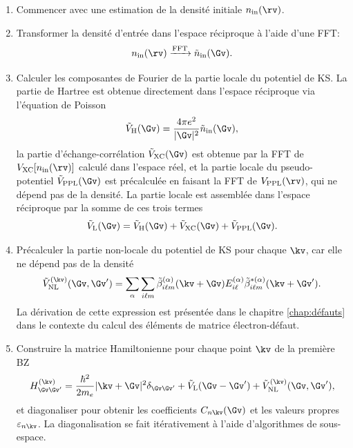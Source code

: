\begin{enumerate}
    \item Commencer avec une estimation de la densité initiale $n_\text{in}(\rv)$.
    \item Transformer la densité d'entrée dans l'espace réciproque à l'aide d'une FFT:
    \begin{equation*}
        n_\text{in}(\rv) \xrightarrow{\text{FFT}} \tilde{n}_\text{in}(\Gv).
    \end{equation*}
    \item Calculer les composantes de Fourier de la partie locale du potentiel de KS. La partie de Hartree est obtenue directement dans l'espace réciproque via l'équation de Poisson
    \begin{equation*}
        \tilde{V}_\text{H}(\Gv)=\frac{4\pi e^2}{|\Gv|^2}\tilde{n}_\text{in}(\Gv),
    \end{equation*}
    la partie d'échange-corrélation $\tilde{V}_\text{XC}(\Gv)$ est obtenue par la FFT de $V_\text{XC}[n_\text{in}(\rv)]$ calculé dans l'espace réel, et la partie locale du pseudo-potentiel $\tilde{V}_\text{PPL}(\Gv)$ est précalculée en faisant la FFT de $V_\text{PPL}(\rv)$, qui ne dépend pas de la densité. La partie locale est assemblée dans l'espace réciproque par la somme de ces trois termes
    \begin{equation*}
        \tilde{V}_\text{L}(\Gv) = \tilde{V}_\text{H}(\Gv)+\tilde{V}_\text{XC}(\Gv)+\tilde{V}_\text{PPL}(\Gv).
    \end{equation*}
    \item Précalculer la partie non-locale du potentiel de KS pour chaque $\kv$, car elle ne dépend pas de la densité
    \begin{equation*}
        \tilde{V}_\text{NL}^{(\kv)}(\Gv, \Gv')=\sum_\alpha\sum_{i\ell m}\tilde{\beta}_{i\ell m}^{(\alpha)}(\kv+\Gv)E_{i\ell}^{(\alpha)}\tilde{\beta}^{*(\alpha)}_{i\ell m}(\kv+\Gv').
    \end{equation*}
    La dérivation de cette expression est présentée dans le chapitre \ref{chap:défauts} dans le contexte du calcul des éléments de matrice électron-défaut.
    \item Construire la matrice Hamiltonienne pour chaque point $\kv$ de la première BZ
    \begin{equation*}
        H^{(\kv)}_{\Gv\Gv'}=\frac{\hbar^2}{2m_e}|\kv+\Gv|^2\delta_{\Gv\Gv'}+\tilde{V}_\text{L}(\Gv-\Gv')+\tilde{V}^{(\kv)}_\text{NL}(\Gv,\Gv'),
    \end{equation*}
    et diagonaliser pour obtenir les coefficients $C_{n\kv}(\Gv)$ et les valeurs propres $\varepsilon_{n\kv}$. La diagonalisation se fait itérativement à l'aide d'algorithmes de sous-espace.

\end{enumerate}

